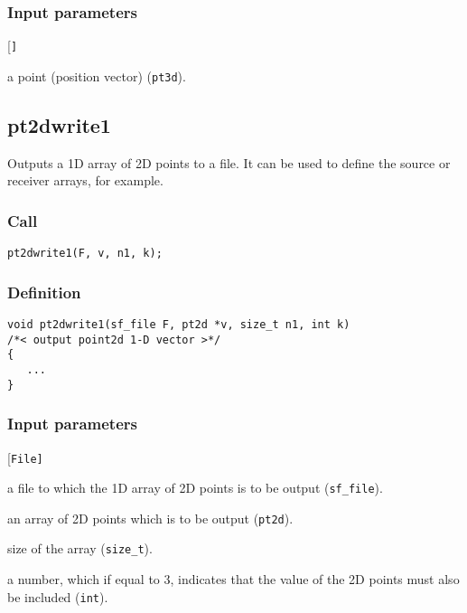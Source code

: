 \subsubsection*{Input parameters}
\begin{desclist}{\tt }{\quad}[\tt ]
   \setlength\itemsep{0pt}
   \item[P] a point (position vector) (\texttt{pt3d}).     
\end{desclist}




\subsection{{pt2dwrite1}}
Outputs a 1D array of 2D points to a file. It can be used to define the source or receiver arrays, for example.

\subsubsection*{Call}
\begin{verbatim}pt2dwrite1(F, v, n1, k);\end{verbatim}

\subsubsection*{Definition}
\begin{verbatim}
void pt2dwrite1(sf_file F, pt2d *v, size_t n1, int k)
/*< output point2d 1-D vector >*/
{
   ...    
}
\end{verbatim}

\subsubsection*{Input parameters}
\begin{desclist}{\tt }{\quad}[\tt File]
   \setlength\itemsep{0pt}
   \item[File] a file to which the 1D array of 2D points is to be output (\texttt{sf\_file}). 
   \item[v]    an array of 2D points which is to be output (\texttt{pt2d}). 
   \item[n1]   size of the array (\texttt{size\_t}). 
   \item[k]    a number, which if equal to 3, indicates that the value of the 2D points must also be included (\texttt{int}).     
\end{desclist}




